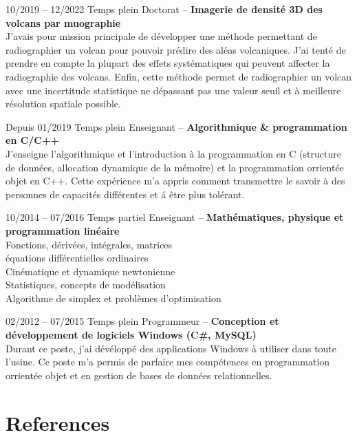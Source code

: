 \documentclass[
	10pt,
]{FreemanCV}
\begin{document}
\begin{paracol}{2}
\jobentry
	{10/2019 -- 12/2022}
	{Temps plein}
	{Doctorat -- \uca}
	{}
	{\textbf{Imagerie de densit\'e 3D des volcans par muographie}}\\
	{
		J'avais pour mission principale de d\'evelopper une m\'ethode permettant de radiographier un volcan pour pouvoir pr\'edire des al\'eas volcaniques. J'ai tent\'e de prendre en compte la plupart des effets syst\'ematiques qui peuvent affecter la radiographie des volcans. Enfin, cette m\'ethode permet de radiographier un volcan avec une incertitude statistique ne d\'epassant pas une valeur seuil et \`a meilleure r\'esolution spatiale possible.
	}
\medskip
\medskip

\jobentry
	{Depuis 01/2019}
	{Temps plein}
	{Enseignant -- \ueh}
	{}
	{\textbf{Algorithmique \& programmation en C/C++}}\\
	{
		J'enseigne l'algorithmique et l'introduction \`a la programmation en C (structure de donn\'ees, allocation dynamique de la m\'emoire) et la programmation orrient\'ee objet en C++. Cette exp\'erience m'a appris comment transmettre le savoir \`a des personnes de capacit\'es diff\'erentes et \'a \^etre plus tol\'erant.
	}
\medskip
\medskip

\jobentry
	{10/2014 -- 07/2016}
	{Temps partiel}
	{Enseignant -- \unif}
	{}
	{\textbf{Math\'ematiques, physique et programmation lin\'eaire}}\\
	{
		Fonctions, d\'eriv\'ees, int\'egrales, matrices \\
		\'equations diff\'erentielles ordinaires\\
		Cin\'ematique et dynamique newtonienne\\
		Statistiques, concepts de mod\'elisation\\
		Algorithme de simplex et problèmes d’optimisation
	}
\medskip
\medskip

\jobentry
	{02/2012 -- 07/2015}
	{Temps plein}
	{Programmeur -- \usjldd}
	{}
	{\textbf{Conception et d\'eveloppement de logiciels Windows (C\#, MySQL)}}\\
	{
		Durant ce poste, j'ai d\'ev\'elopp\'e des applications Windows \`a utiliser dans toute l'usine. Ce poste m'a permis de parfaire mes comp\'etences en programmation orrient\'ee objet et en gestion de bases de donn\'ees relationnelles.
	}
\medskip
\medskip


\section{References}


\end{paracol}
\end{document}
